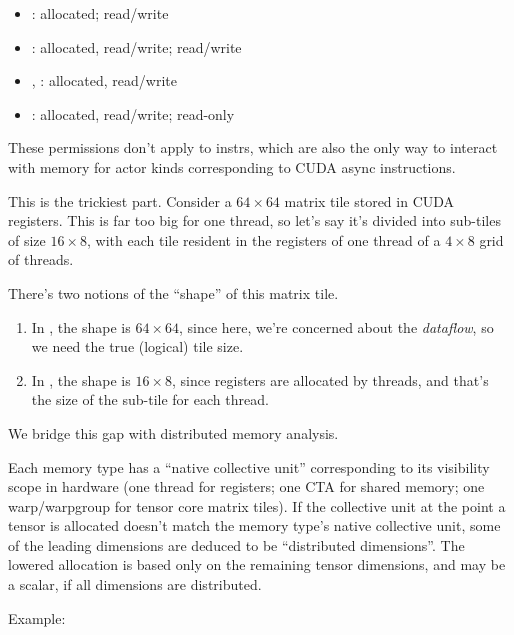 \filbreak
\begin{itemize}
  \filbreak
  \item {}:  allocated;  read/write
  \filbreak
  \item {}:  allocated, read/write;  read/write
  \filbreak
  \item {}, :  allocated, read/write
  \filbreak
  \item {}:  allocated, read/write;  read-only
\end{itemize}

\filbreak
These permissions don't apply to instrs, which are also the only way to interact with memory for actor kinds corresponding to CUDA async instructions.

\filbreak
{} This is the trickiest part.
Consider a $64 \times 64$ matrix tile stored in CUDA registers.
This is far too big for one thread, so let's say it's divided into sub-tiles of size $16 \times 8$, with each tile resident in the registers of one thread of a $4 \times 8$ grid of threads.

\filbreak
There's two notions of the ``shape'' of this matrix tile.
\begin{enumerate}
  \item In , the shape is $64 \times 64$, since here, we're concerned about the \textit{dataflow}, so we need the true (logical) tile size.
  \item In , the shape is $16 \times 8$, since registers are allocated by threads, and that's the size of the sub-tile for each thread.
\end{enumerate}
We bridge this gap with distributed memory analysis.

\filbreak
Each memory type has a ``native collective unit'' corresponding to its visibility scope in hardware (one thread for registers; one CTA for shared memory; one warp/warpgroup for tensor core matrix tiles).
If the collective unit at the point a tensor is allocated doesn't match the memory type's native collective unit, some of the leading dimensions are deduced to be ``distributed dimensions''.
The lowered allocation is based only on the remaining tensor dimensions, and may be a scalar, if all dimensions are distributed.

\filbreak
Example:


